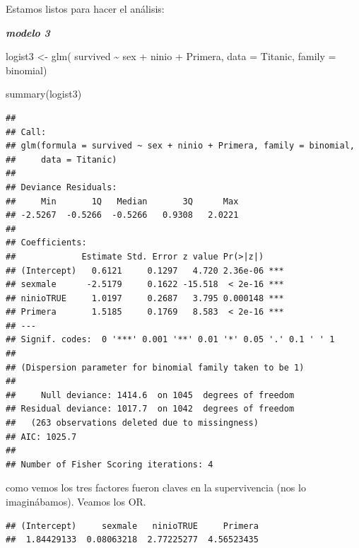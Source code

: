 \documentclass[
]{book}
\newenvironment{Shaded}{\begin{snugshade}}{\end{snugshade}}
\newcommand{\AttributeTok}[1]{\textcolor[rgb]{0.77,0.63,0.00}{#1}}
\newcommand{\FunctionTok}[1]{\textcolor[rgb]{0.00,0.00,0.00}{#1}}
\newcommand{\NormalTok}[1]{#1}
\newcommand{\OtherTok}[1]{\textcolor[rgb]{0.56,0.35,0.01}{#1}}
\newcommand{\SpecialCharTok}[1]{\textcolor[rgb]{0.00,0.00,0.00}{#1}}
\begin{document}
Estamos listos para hacer el análisis:

\textbf{\emph{modelo 3}}

\begin{Shaded}
\begin{Highlighting}[]
\NormalTok{logist3 }\OtherTok{\textless{}{-}} \FunctionTok{glm}\NormalTok{( survived }\SpecialCharTok{\textasciitilde{}}\NormalTok{ sex }\SpecialCharTok{+}\NormalTok{ ninio }\SpecialCharTok{+}\NormalTok{ Primera, }\AttributeTok{data =}\NormalTok{ Titanic, }\AttributeTok{family =}\NormalTok{ binomial)}

\FunctionTok{summary}\NormalTok{(logist3)}
\end{Highlighting}
\end{Shaded}

\begin{verbatim}
## 
## Call:
## glm(formula = survived ~ sex + ninio + Primera, family = binomial, 
##     data = Titanic)
## 
## Deviance Residuals: 
##     Min       1Q   Median       3Q      Max  
## -2.5267  -0.5266  -0.5266   0.9308   2.0221  
## 
## Coefficients:
##             Estimate Std. Error z value Pr(>|z|)    
## (Intercept)   0.6121     0.1297   4.720 2.36e-06 ***
## sexmale      -2.5179     0.1622 -15.518  < 2e-16 ***
## ninioTRUE     1.0197     0.2687   3.795 0.000148 ***
## Primera       1.5185     0.1769   8.583  < 2e-16 ***
## ---
## Signif. codes:  0 '***' 0.001 '**' 0.01 '*' 0.05 '.' 0.1 ' ' 1
## 
## (Dispersion parameter for binomial family taken to be 1)
## 
##     Null deviance: 1414.6  on 1045  degrees of freedom
## Residual deviance: 1017.7  on 1042  degrees of freedom
##   (263 observations deleted due to missingness)
## AIC: 1025.7
## 
## Number of Fisher Scoring iterations: 4
\end{verbatim}

como vemos los tres factores fueron claves en la supervivencia (nos lo imaginábamos). Veamos los OR.

\begin{Shaded}
\end{Shaded}

\begin{verbatim}
## (Intercept)     sexmale   ninioTRUE     Primera 
##  1.84429133  0.08063218  2.77225277  4.56523435
\end{verbatim}
\end{document}
